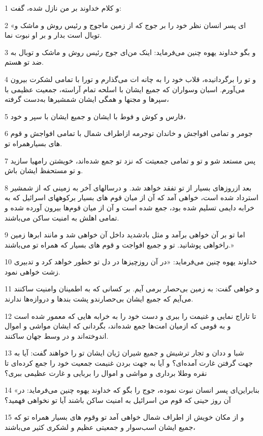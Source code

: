 \par 1 و کلام خداوند بر من نازل شده، گفت:
\par 2 «ای پسر انسان نظر خود را بر جوج که از زمین ماجوج و رئیس روش و ماشک و توبال است بدار و بر او نبوت نما.
\par 3 و بگو خداوند یهوه چنین می‌فرماید: اینک من‌ای جوج رئیس روش و ماشک و توبال به ضد تو هستم.
\par 4 و تو را برگردانیده، قلاب خود را به چانه ات می‌گذارم و تورا با تمامی لشکرت بیرون می‌آورم. اسبان وسواران که جمیع ایشان با اسلحه تمام آراسته، جمعیت عظیمی با سپرها و مجنها و همگی ایشان شمشیرها به‌دست گرفته،
\par 5 فارس و کوش و فوط با ایشان و جمیع ایشان با سپر و خود،
\par 6 جومر و تمامی افواجش و خاندان توجرمه ازاطراف شمال با تمامی افواجش و قوم های بسیارهمراه تو.
\par 7 پس مستعد شو و تو و تمامی جمعیتت که نزد تو جمع شده‌اند، خویشتن رامهیا سازید و تو مستحفظ ایشان باش.
\par 8 بعد ازروزهای بسیار از تو تفقد خواهد شد. و درسالهای آخر به زمینی که از شمشیر استرداد شده است، خواهی آمد که آن از میان قوم های بسیار برکوههای اسرائیل که به خرابه دایمی تسلیم شده بود، جمع شده است و آن از میان قوم‌ها بیرون آورده شده و تمامی اهلش به امنیت ساکن می‌باشند.
\par 9 اما تو بر آن خواهی برآمد و مثل بادشدید داخل آن خواهی شد و مانند ابرها زمین راخواهی پوشانید. تو و جمیع افواجت و قوم های بسیار که همراه تو می‌باشند.»
\par 10 خداوند یهوه چنین می‌فرماید: «در آن روزچیزها در دل تو خطور خواهد کرد و تدبیری زشت خواهی نمود.
\par 11 و خواهی گفت: به زمین بی‌حصار برمی آیم. بر کسانی که به اطمینان وامنیت ساکنند می‌آیم که جمیع ایشان بی‌حصارندو پشت بندها و دروازه‌ها ندارند.
\par 12 تا تاراج نمایی و غنیمت را ببری و دست خود را به خرابه هایی که معمور شده است و به قومی که ازمیان امت‌ها جمع شده‌اند، بگردانی که ایشان مواشی و اموال اندوخته‌اند و در وسط جهان ساکنند.
\par 13 شبا و ددان و تجار ترشیش و جمیع شیران ژیان ایشان تو را خواهند گفت: آیا به جهت گرفتن غارت آمده‌ای؟ و آیا به جهت بردن غنیمت جمعیت خود را جمع کرده‌ای تا نقره وطلا برداری و مواشی و اموال را بربایی و غارت عظیمی ببری؟
\par 14 «بنابراین‌ای پسر انسان نبوت نموده، جوج را بگو که خداوند یهوه چنین می‌فرماید: در آن روز حینی که قوم من اسرائیل به امنیت ساکن باشند آیا تو نخواهی فهمید؟
\par 15 و از مکان خویش از اطراف شمال خواهی آمد تو وقوم های بسیار همراه تو که جمیع ایشان اسب‌سوار و جمعیتی عظیم و لشکری کثیر می‌باشند،
